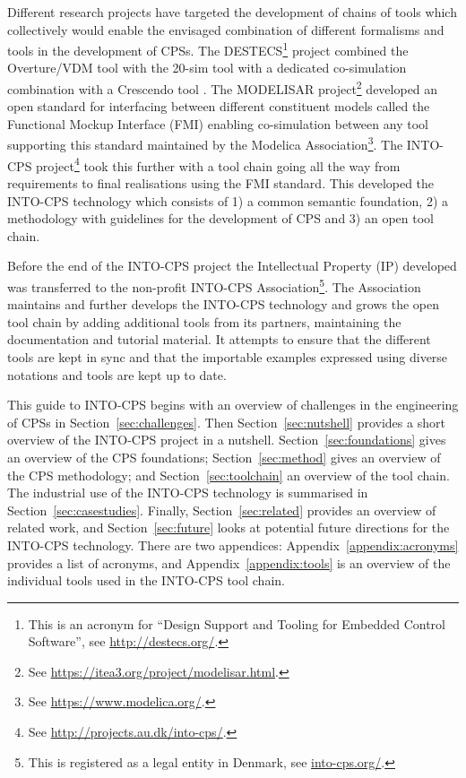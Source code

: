 Different research projects have targeted the development of chains of tools which collectively would enable the envisaged combination of different formalisms and tools in the development of CPSs. The DESTECS\footnote{This is an acronym for ``Design Support and Tooling for Embedded Control Software'', see \url{http://destecs.org/}.} project \cite{Broenink&10} combined the Overture/VDM tool \cite{Larsen&10a} with the 20-sim tool \cite{Kleijn06} with a dedicated co-simulation combination with a Crescendo tool \cite{Fitzgerald&14c}. The MODELISAR project\footnote{See \url{https://itea3.org/project/modelisar.html}.} developed an open standard for interfacing between different constituent models called the Functional Mockup Interface (FMI) enabling co-simulation between any tool supporting this standard maintained by the Modelica Association\footnote{See \url{https://www.modelica.org/}.}. The INTO-CPS project\footnote{See \url{http://projects.au.dk/into-cps/}.} took this further with a tool chain going all the way from requirements to final realisations using the FMI standard. This developed the INTO-CPS technology which consists of 1) a common semantic foundation, 2) a methodology with guidelines for the development of CPS and 3) an open tool chain.

Before the end of the INTO-CPS project the Intellectual Property (IP) developed was transferred to the non-profit INTO-CPS Association\footnote{This is registered as a legal entity in Denmark, see \url{into-cps.org/}.}. The Association maintains and further develops the INTO-CPS technology and grows the open tool chain by adding additional tools from its partners, maintaining the documentation and tutorial material. It attempts to ensure that the different tools are kept in sync and that the importable examples expressed using diverse notations and tools are kept up to date.

This guide to INTO-CPS begins with an overview of challenges in the engineering of CPSs in Section~\ref{sec:challenges}. Then Section~\ref{sec:nutshell} provides a short overview of the INTO-CPS project in a nutshell. Section~\ref{sec:foundations} gives an overview of the CPS foundations; Section~\ref{sec:method} gives an overview of the CPS methodology; and Section~\ref{sec:toolchain} an overview of the tool chain. The industrial use of the INTO-CPS technology is summarised in Section~\ref{sec:casestudies}. Finally, Section~\ref{sec:related} provides an overview of related work, and Section~\ref{sec:future} looks at potential future directions for the INTO-CPS technology. 
There are two appendices: Appendix~\ref{appendix:acronyms} provides a list of acronyms,  
and Appendix~\ref{appendix:tools} is an overview of the individual tools used in the INTO-CPS tool chain.

